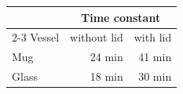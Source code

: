\begin{tabular}{lrr}
    \toprule
           & \multicolumn{2}{c}{Time constant} \\
    \cmidrule(lr){2-3}
    Vessel & without lid & with lid \\
    \midrule
    Mug    & 24 min & 41 min \\
    Glass  & 18 min & 30 min \\
    \bottomrule
\end{tabular}
